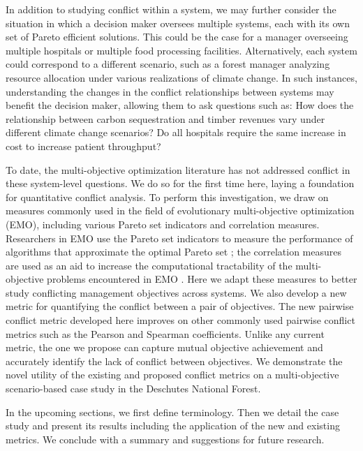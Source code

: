 In addition to studying conflict within a system, we may further consider the situation in which a decision maker oversees multiple systems, each with its own set of Pareto efficient solutions. This could be the case for a manager overseeing multiple hospitals or multiple food processing facilities. Alternatively, each system could correspond to a different scenario, such as a forest manager analyzing resource allocation under various realizations of climate change. In such instances, understanding the changes in the conflict relationships between systems may benefit the decision maker, allowing them to ask questions such as: How does the relationship between carbon sequestration and timber revenues vary under different climate change scenarios? Do all hospitals require the same increase in cost to increase patient throughput?

To date, the multi-objective optimization literature has not addressed conflict in these system-level questions. We do so for the first time here, laying a foundation for quantitative conflict analysis. To perform this investigation, we draw on measures commonly used in the field of evolutionary multi-objective optimization (EMO), including various Pareto set indicators and correlation measures. Researchers in EMO use the Pareto set indicators to measure the performance of algorithms that approximate the optimal Pareto set \cite{zitzler2003performance}; the correlation measures are used as an aid to increase the computational tractability of the multi-objective problems encountered in EMO \cite{brockhoff2006all}. Here we adapt these measures to better study conflicting management objectives across systems. We also develop a new metric for quantifying the conflict between a pair of objectives. The new pairwise conflict metric developed here improves on other commonly used pairwise conflict metrics such as the Pearson and Spearman coefficients. Unlike any current metric, the one we propose can capture mutual objective achievement and accurately identify the lack of conflict between objectives. We demonstrate the novel utility of the existing and proposed conflict metrics on a multi-objective scenario-based case study in the Deschutes National Forest.

In the upcoming sections, we first define terminology. Then we detail the case study and present its results including the application of the new and existing metrics. We conclude with a summary and suggestions for future research.